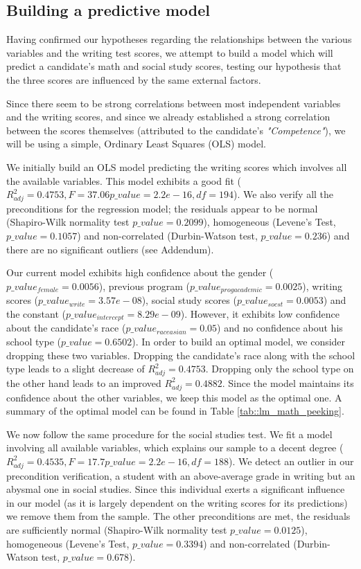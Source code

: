 \documentclass[10pt]{article}
\begin{document}
	
	\subsection{Building a predictive model}
	Having confirmed our hypotheses regarding the relationships between the various variables and the writing test scores, we attempt to build a model which will predict a candidate's math and social study scores, testing our hypothesis that the three scores are influenced by the same external factors. 
	
	Since there seem to be strong correlations between most independent variables and the writing scores, and since we already established a strong correlation between the scores themselves (attributed to the candidate's \textit{"Competence"}), we will be using a simple, Ordinary Least Squares (OLS) model.
	
	We initially build an OLS model predicting the writing scores which involves all the available variables. This model exhibits a good fit ($R^2_{adj} = 0.4753, F= 37.06 p\_value=2.2e-16, df=194$). We also verify all the preconditions for the regression model; the residuals appear to be normal (Shapiro-Wilk normality test $p\_value = 0.2099$), homogeneous (Levene's Test, $p\_value = 0.1057$) and non-correlated (Durbin-Watson test, $p\_value=0.236$) and there are no significant outliers (see Addendum).
	
	Our current model exhibits high confidence about the gender ($p\_value_{female} = 0.0056$), previous program  ($p\_value_{progacademic} = 0.0025$), writing scores ($p\_value_{write} = 3.57e-08$), social study scores ($p\_value_{socst} = 0.0053$) and the constant ($p\_value_{intercept} = 8.29e-09$). However, it exhibits low confidence about the candidate's race ($p\_value_{raceasian} = 0.05$) and no confidence about his school type ($p\_value=0.6502$). In order to build an optimal model, we consider dropping these two variables. Dropping the candidate's race along with the school type leads to a slight decrease of $R^2_{adj} = 0.4753$. Dropping only the school type on the other hand leads to an improved $R^2_{adj} = 0.4882$. Since the model maintains its confidence about the other variables, we keep this model as the optimal one. A summary of the optimal model can be found in Table \ref{tab::lm_math_peeking}.
	
	We now follow the same procedure for the social studies test. We fit a model involving all available variables, which explains our sample to a decent degree ($R^2_{adj} = 0.4535, F= 17.7 p\_value=2.2e-16, df=188$). We detect an outlier in our precondition verification, a student with an above-average grade in writing but an abysmal one in social studies. Since this individual exerts a significant influence in our model (as it is largely dependent on the writing scores for its predictions) we remove them from the sample. The other preconditions are met, the residuals are sufficiently normal (Shapiro-Wilk normality test $p\_value = 0.0125$), homogeneous (Levene's Test, $p\_value = 0.3394$) and non-correlated (Durbin-Watson test, $p\_value=0.678$).
	
\end{document}
